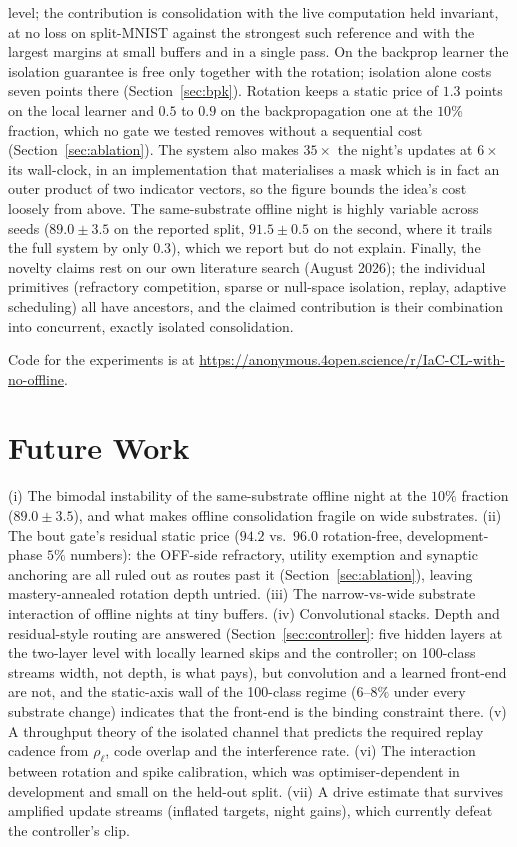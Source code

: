 \documentclass{article}
\begin{document}
level; the contribution is consolidation with the live computation held invariant, at no
loss on split-MNIST against the strongest such reference and with the largest margins at
small buffers and in a single pass. On the backprop learner the isolation guarantee is free
only together with the rotation; isolation alone costs seven points there
(Section~\ref{sec:bpk}). Rotation keeps a static price of $1.3$ points on the local learner
and $0.5$ to $0.9$ on the backpropagation one at the $10\%$ fraction, which no gate we
tested removes without a sequential cost (Section~\ref{sec:ablation}). The system also makes
$35\times$ the night's updates at $6\times$ its wall-clock, in an implementation that
materialises a mask which is in fact an outer product of two indicator vectors, so the
figure bounds the idea's cost loosely from above. The same-substrate
offline night is highly variable across seeds ($89.0\pm3.5$ on the reported split,
$91.5\pm0.5$ on the second, where it trails the full system by only $0.3$), which we report
but do not explain. Finally, the novelty claims rest on our own literature search (August
2026); the individual primitives (refractory competition, sparse or null-space isolation,
replay, adaptive scheduling) all have ancestors, and the claimed contribution is their
combination into concurrent, exactly isolated consolidation.

Code for the experiments is at \url{https://anonymous.4open.science/r/IaC-CL-with-no-offline}.

\section{Future Work}
\label{sec:future}

(i) The bimodal instability of the same-substrate offline night at the $10\%$ fraction
($89.0\pm3.5$), and what makes offline consolidation fragile on wide substrates. (ii) The
bout gate's residual static price ($94.2$ vs.\ $96.0$ rotation-free, development-phase $5\%$
numbers): the OFF-side refractory, utility exemption and synaptic anchoring are all ruled
out as routes past it (Section~\ref{sec:ablation}), leaving mastery-annealed rotation depth
untried. (iii) The narrow-vs-wide substrate interaction of offline nights at tiny buffers.
(iv) Convolutional stacks. Depth and residual-style routing are answered
(Section~\ref{sec:controller}: five hidden layers at the two-layer level with locally
learned skips and the controller; on 100-class streams width, not depth, is what pays), but
convolution and a learned front-end are not, and the static-axis wall of the 100-class
regime ($6$--$8\%$ under every substrate change) indicates that the front-end is the
binding constraint there. (v) A throughput theory of the isolated channel that predicts the
required replay cadence from $\rho_\ell$, code overlap and the interference rate. (vi) The
interaction between rotation and spike calibration, which was optimiser-dependent in
development and small on the held-out split. (vii) A drive estimate that survives amplified
update streams (inflated targets, night gains), which currently defeat the controller's
clip.
\end{document}
